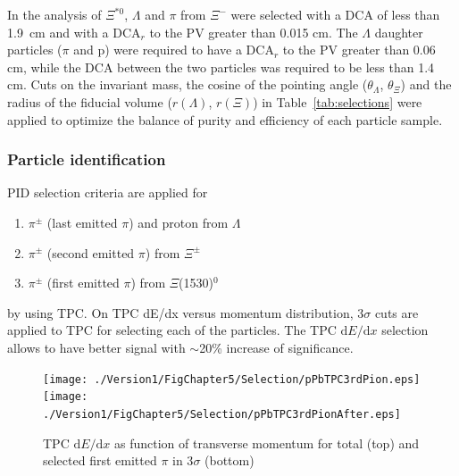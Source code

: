 In the analysis of $\Xi^{*0}$, $\Lambda$ and $\pi$ from $\Xi^{-}$ were 
selected with a DCA of less than 1.9~cm and with a DCA$_r$ to the PV greater than 0.015 cm. 
The $\Lambda$ daughter particles ($\pi$ and p) were required to have a DCA$_r$ to the PV greater 
than 0.06 cm, while the DCA between the two particles was required to be less than 1.4 cm. Cuts on 
the invariant mass, the cosine of the pointing angle ($\theta_\Lambda$, $\theta_\Xi$) and the radius of 
the fiducial volume ($r(\Lambda)$, $r(\Xi)$) in Table~\ref{tab:selections} were applied to optimize 
the balance of purity and efficiency of each particle sample. 


\newpage
\subsubsection{Particle identification}\label{sec:pPb:PID}
PID selection criteria are applied for
 
 \begin{enumerate}
\item $\pi^{\pm}$ (last emitted $\pi$) and proton from $\Lambda$
\item $\pi^{\pm}$ (second emitted $\pi$)   from $\Xi^{\pm}$
\item $\pi^{\pm}$ (first emitted $\pi$) from  $\Xi$(1530)$^{0}$
\end{enumerate}
 by using TPC. On TPC dE/dx versus momentum distribution, 3$\sigma$ cuts are applied to TPC for selecting each of the particles. The TPC $\mathrm{d}E/\mathrm{d}x$ selection allows to have better signal with $\sim$20\% increase of significance. 
  
 
\begin{figure}[htbp]
\begin{center}
\texttt{[image: ./Version1/FigChapter5/Selection/pPbTPC3rdPion.eps]}
\hspace{0.5cm}
\texttt{[image: ./Version1/FigChapter5/Selection/pPbTPC3rdPionAfter.eps]}
\label{fig:pPb:TPCpionFirstEmitted} 
\caption{ TPC $\mathrm{d}E/\mathrm{d}x$ as function of transverse momentum for total (top) and selected first emitted $\pi$ in 3$\sigma$ (bottom) }
\end{center}
\end{figure}


